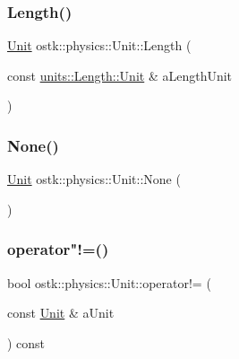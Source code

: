 \subsubsection{\texorpdfstring{Length()}{Length()}}
{\footnotesize\ttfamily \hyperlink{classostk_1_1physics_1_1_unit}{Unit} ostk\+::physics\+::\+Unit\+::\+Length (\begin{DoxyParamCaption}\item[{const \hyperlink{classostk_1_1physics_1_1units_1_1_length_a2664470a7eedf5d45c88861fe69badea}{units\+::\+Length\+::\+Unit} \&}]{a\+Length\+Unit }\end{DoxyParamCaption})\hspace{0.3cm}{\ttfamily [static]}}

\mbox{\label{classostk_1_1physics_1_1_unit_a72a993421e48c8b2d4d4fd89ce0142da}} 
\subsubsection{\texorpdfstring{None()}{None()}}
{\footnotesize\ttfamily \hyperlink{classostk_1_1physics_1_1_unit}{Unit} ostk\+::physics\+::\+Unit\+::\+None (\begin{DoxyParamCaption}{ }\end{DoxyParamCaption})\hspace{0.3cm}{\ttfamily [static]}}

\mbox{\label{classostk_1_1physics_1_1_unit_ab99c2e4afec3e69ba573528dd9f3f9ac}} 
\subsubsection{\texorpdfstring{operator"!=()}{operator!=()}}
{\footnotesize\ttfamily bool ostk\+::physics\+::\+Unit\+::operator!= (\begin{DoxyParamCaption}\item[{const \hyperlink{classostk_1_1physics_1_1_unit}{Unit} \&}]{a\+Unit }\end{DoxyParamCaption}) const}

\mbox{\label{classostk_1_1physics_1_1_unit_a1ca37a2c58beea2b837504356ac9a312}} 
